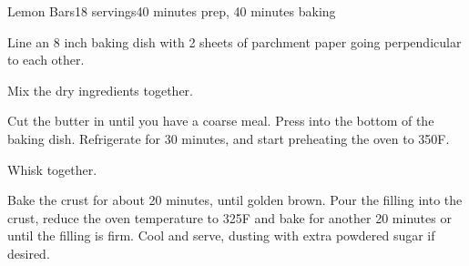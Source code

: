 \documentclass[../Cookbook.tex]{subfiles}
\begin{document}
\begin{recipe}{Lemon Bars}{18 servings}{40 minutes prep, 40 minutes baking}

Line an 8 inch baking dish with 2 sheets of parchment paper going perpendicular to each other.

Mix the dry ingredients together.

Cut the butter in until you have a coarse meal. Press into the bottom of the baking dish. Refrigerate for 30 minutes, and start preheating the oven to 350\0F.

Whisk together.

Bake the crust for about 20 minutes, until golden brown. Pour the filling into the crust, reduce the oven temperature to 325\0F and bake for another 20 minutes or until the filling is firm. Cool and serve, dusting with extra powdered sugar if desired.


\end{recipe}
\end{document}
